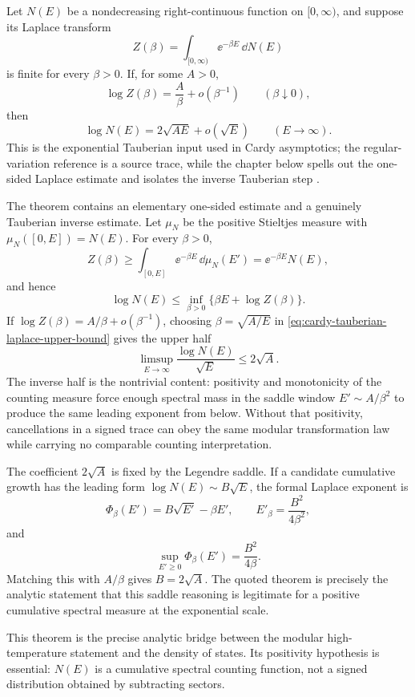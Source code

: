 \begin{quotedtheorem}
\label{qthm:exponential-tauberian-cardy}
Let \(N(E)\) be a nondecreasing right-continuous function on
\([0,\infty)\), and suppose its Laplace transform
\[
  Z(\beta)=\int_{[0,\infty)}\ee^{-\beta E}\,\dd N(E)
\]
is finite for every \(\beta>0\).  If, for some \(A>0\),
\[
  \log Z(\beta)=\frac A\beta+o(\beta^{-1})
  \qquad(\beta\downarrow0),
\]
then
\[
  \log N(E)=2\sqrt{AE}+o(\sqrt E)
  \qquad(E\to\infty).
\]
This is the exponential Tauberian input used in Cardy asymptotics; the
regular-variation reference is a source trace, while the chapter below spells
out the one-sided Laplace estimate and isolates the inverse Tauberian step
\cite{BinghamGoldieTeugels1987}.
\end{quotedtheorem}

The theorem contains an elementary one-sided estimate and a genuinely
Tauberian inverse estimate.  Let \(\mu_N\) be the positive Stieltjes measure
with \(\mu_N([0,E])=N(E)\).  For every \(\beta>0\),
\[
  Z(\beta)
  \ge
  \int_{[0,E]}\ee^{-\beta E}\,\dd\mu_N(E')
  =
  \ee^{-\beta E}N(E),
\]
and hence
\begin{equation}
  \log N(E)
  \le
  \inf_{\beta>0}\{\beta E+\log Z(\beta)\}.
  \label{eq:cardy-tauberian-laplace-upper-bound}
\end{equation}
If \(\log Z(\beta)=A/\beta+o(\beta^{-1})\), choosing
\(\beta=\sqrt{A/E}\) in \eqref{eq:cardy-tauberian-laplace-upper-bound}
gives the upper half
\[
  \limsup_{E\to\infty}{\frac{\log N(E)}{\sqrt E}}\le 2\sqrt A .
\]
The inverse half is the nontrivial content: positivity and monotonicity of the
counting measure force enough spectral mass in the saddle window
\(E'\sim A/\beta^2\) to produce the same leading exponent from below.  Without
that positivity, cancellations in a signed trace can obey the same modular
transformation law while carrying no comparable counting interpretation.

The coefficient \(2\sqrt A\) is fixed by the Legendre saddle.  If a candidate
cumulative growth has the leading form \(\log N(E)\sim B\sqrt E\), the formal
Laplace exponent is
\[
  \Phi_\beta(E')=B\sqrt{E'}-\beta E',
  \qquad
  E'_\beta=\frac{B^2}{4\beta^2},
\]
and
\[
  \sup_{E'\ge0}\Phi_\beta(E')=\frac{B^2}{4\beta}.
\]
Matching this with \(A/\beta\) gives \(B=2\sqrt A\).  The quoted theorem is
precisely the analytic statement that this saddle reasoning is legitimate for
a positive cumulative spectral measure at the exponential scale.

This theorem is the precise analytic bridge between the modular
high-temperature statement and the density of states.  Its positivity
hypothesis is essential: \(N(E)\) is a cumulative spectral counting function,
not a signed distribution obtained by subtracting sectors.

